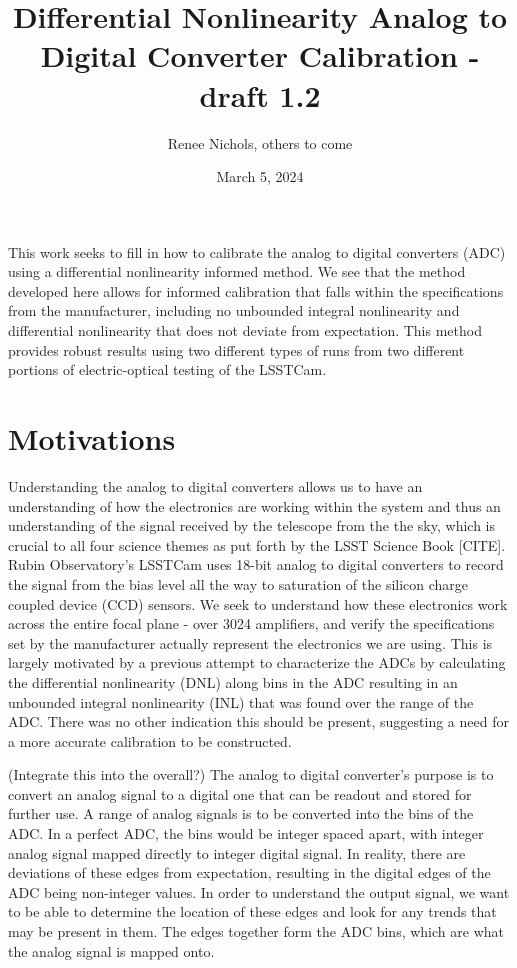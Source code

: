 \documentclass[11pt, letterpaper]{article}
\title{Differential Nonlinearity Analog to Digital Converter Calibration - draft 1.2}
\author{Renee Nichols, others to come}
\date{March 5, 2024}
\begin{document}
\maketitle 

This work seeks to fill in how to calibrate the analog to digital converters (ADC) using a differential nonlinearity informed method. We see that the method developed here allows for informed calibration that falls within the specifications from the manufacturer, including no unbounded integral nonlinearity and differential nonlinearity that does not deviate from expectation. This method provides robust results using two different types of runs from two different portions of electric-optical testing of the LSSTCam. 

\section{Motivations}
\indent


Understanding the analog to digital converters allows us to have an understanding of how the electronics are working within the system and thus an understanding of the signal received by the telescope from the the sky, which is crucial to all four science themes as put forth by the LSST Science Book [CITE]. 
Rubin Observatory’s LSSTCam uses 18-bit analog to digital converters to record the signal from the bias level all the way to saturation of the silicon charge coupled device (CCD) sensors. 
We seek to understand how these electronics work across the entire focal plane - over 3024 amplifiers, and verify the specifications set by the manufacturer actually represent the electronics we are using. 
This is largely motivated by a previous attempt to characterize the ADCs by calculating the differential nonlinearity (DNL) along bins in the ADC resulting in an unbounded integral nonlinearity (INL) that was found over the range of the ADC. 
There was no other indication this should be present, suggesting a need for a more accurate calibration to be constructed. 

(Integrate this into the overall?) 
The analog to digital converter’s purpose is to convert an analog signal to a digital one that can be readout and stored for further use. 
A range of analog signals is to be converted into the bins of the ADC. In a perfect ADC, the bins would be integer spaced apart, with integer analog signal mapped directly to integer digital signal.
In reality, there are deviations of these edges from expectation, resulting in the digital edges of the ADC being non-integer values. In order to understand the output signal, we want to be able to determine the location of these edges and look for any trends that may be present in them. 
The edges together form the ADC bins, which are what the analog signal is mapped onto. 
\end{document}
